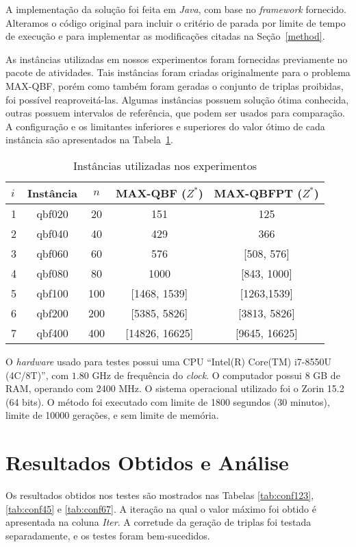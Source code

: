\documentclass{MO824}
\begin{document}
    A implementação da solução foi feita em \emph{Java}, com base no \textit{framework} fornecido. Alteramos o código original para incluir o critério de parada por limite de tempo de execução e para implementar as modificações citadas na Seção~\ref{method}.

    As instâncias utilizadas em nossos experimentos foram fornecidas previamente no pacote de atividades. Tais instâncias foram criadas originalmente para o problema MAX-QBF, porém como também foram geradas o conjunto de triplas proibidas, foi possível reaproveitá-las. Algumas instâncias possuem solução ótima conhecida, outras possuem intervalos de referência, que podem ser usados para comparação. A configuração e os limitantes inferiores e superiores do valor ótimo de cada instância são apresentados na Tabela~\ref{tab:instances}.
    
	\begin{table}[h]
	\centering
	\vspace{-0.5cm}
	\caption{Instâncias utilizadas nos experimentos}
    \vspace{0.3cm}
	\label{tab:instances}
	\begin{tabular}{|l|c|c|c|c|}
		\hline
		$i$ & Instância & $n$ & MAX-QBF ($Z^*$) & MAX-QBFPT ($Z^*$) \\ \hline
		1 & qbf020 & 20 & 151 & 125 \\ \hline
		2 & qbf040 & 40 & 429 & 366 \\ \hline
		3 & qbf060 & 60 & 576 & [508, 576] \\ \hline
		4 & qbf080 & 80 & 1000 & [843, 1000] \\ \hline
		5 & qbf100 & 100 & [1468, 1539] & [1263,1539] \\ \hline
		6 & qbf200 & 200 & [5385, 5826] & [3813, 5826] \\ \hline
		7 & qbf400 & 400 & [14826, 16625] & [9645, 16625] \\ \hline
	\end{tabular}
\end{table}
        
    O \textit{hardware} usado para testes possui uma CPU ``Intel(R) Core(TM) i7-8550U (4C/8T)'', com $1.80$ GHz de frequência do \textit{clock}. O computador possui 8 GB de RAM, operando com 2400 MHz. O sistema operacional utilizado foi o Zorin 15.2 (64 bits). O método foi executado com limite de 1800 segundos (30 minutos), limite de 10000 gerações, e sem limite de memória.

\vspace{-0.18cm}
\section{Resultados Obtidos e Análise}
Os resultados obtidos nos testes são mostrados nas Tabelas \ref{tab:conf123}, \ref{tab:conf45} e \ref{tab:conf67}. A iteração na qual o valor máximo foi obtido é apresentada na coluna \textit{Iter}. A corretude da geração de triplas foi testada separadamente, e os testes foram bem-sucedidos.
\end{document}
